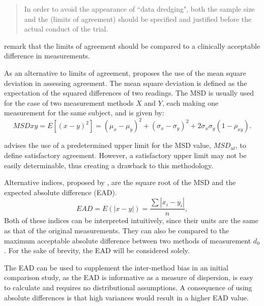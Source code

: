 \documentclass[12pt, a4paper]{report}
\theoremstyle{plain}
\theoremstyle{definition}
\theoremstyle{remark}
\begin{document}
\begin{quote}
	In order to avoid the appearance of ``data dredging", both the
	sample size and the (limits of agreement) should be specified and
	justified before the actual conduct of the trial. \citep{lin}
\end{quote}

\citet{Dewitte} remark that the limits of agreement should be
compared to a clinically acceptable difference in measurements.

As an alternative to limits of agreement, \citet{lin2002} proposes the use of
the mean square deviation in assessing agreement. The mean square
deviation is defined as the expectation of the squared differences
of two readings. The MSD is usually used for the case of two
measurement methods $X$ and $Y$, each making one measurement for
the same subject, and is given by:
\[
MSDxy = E[(x - y)^2]  = (\mu_{x} - \mu_{y})^2 + (\sigma_{x} -
\sigma_{y})^2 + 2\sigma_{x}\sigma_{y}(1-\rho_{xy}).
\]


\citet{Barnhart} advises the use of a predetermined upper limit
for the MSD value, $MSD_{ul}$, to define satisfactory agreement.
However, a satisfactory upper limit may not be easily
determinable, thus creating a drawback to this methodology.


Alternative indices, proposed by \citet{Barnhart}, are the square root of the MSD and the expected absolute difference (EAD). 
\[
EAD = E(|x - y|) = \frac{\sum |x_{i}- y_{i}|}{n},
\]
Both of these indices can be interpreted intuitively, since their units are the same as that of the original measurements. They can also be compared to the maximum acceptable absolute difference between two methods of measurement $d_{0}$. For the sake of brevity, the EAD will be considered solely.

The EAD can be used to supplement the inter-method bias in an
initial comparison study, as the EAD is informative as a measure
of dispersion, is easy to calculate and requires no distributional
assumptions. A consequence of using absolute differences is that high variances would result in a higher EAD value. 
\end{document}
